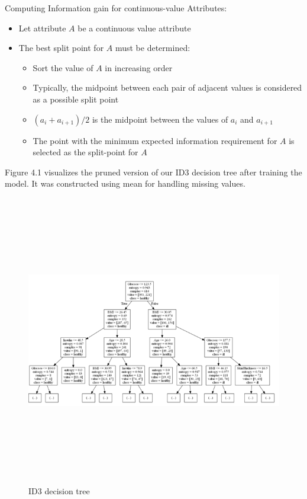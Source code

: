 Computing Information gain for continuous-value Attributes:
\begin{itemize}
    \item Let attribute $A$ be a continuous value attribute
    \item The best split point for $A$ must be determined:
    \begin{itemize}
        \item Sort the value of $A$ in increasing order
        \item Typically, the midpoint between each pair of adjacent values is   considered as a possible split point
        \item $ (a_i + a_{i+1}) / 2 $ is the midpoint between the values of $ a_i $ and $ a_{i+1} $
        \item The point with the minimum expected information requirement for $A$ is selected as the split-point for $A$
    \end{itemize}
\end{itemize}
\newpage
Figure 4.1 visualizes the pruned version of our ID3 decision tree after training the model. It was constructed using mean for handling missing values. 
\vspace{0.27in}
\begin{figure}[h]
\centering 
\includegraphics[width=7in,height=5in]{id3.PNG}
\caption{\label{fig:subBDDs1}ID3 decision tree}
\end{figure}
